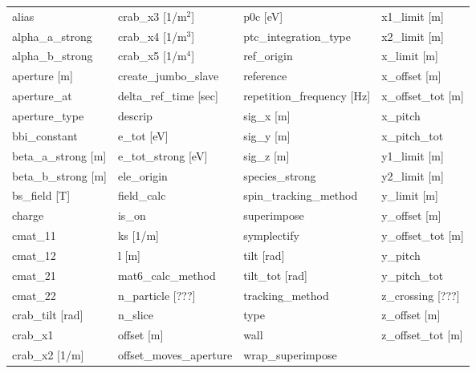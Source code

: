 \begin{tabular}{llll} \toprule
alias                            & crab_x3 [1/m$^2$]                & p0c [eV]                         & x1_limit [m]                     \\
alpha_a_strong                   & crab_x4 [1/m$^3$]                & ptc_integration_type             & x2_limit [m]                     \\
alpha_b_strong                   & crab_x5 [1/m$^4$]                & ref_origin                       & x_limit [m]                      \\
aperture [m]                     & create_jumbo_slave               & reference                        & x_offset [m]                     \\
aperture_at                      & delta_ref_time [sec]             & repetition_frequency [Hz]        & x_offset_tot [m]                 \\
aperture_type                    & descrip                          & sig_x [m]                        & x_pitch                          \\
bbi_constant                     & e_tot [eV]                       & sig_y [m]                        & x_pitch_tot                      \\
beta_a_strong [m]                & e_tot_strong [eV]                & sig_z [m]                        & y1_limit [m]                     \\
beta_b_strong [m]                & ele_origin                       & species_strong                   & y2_limit [m]                     \\
bs_field [T]                     & field_calc                       & spin_tracking_method             & y_limit [m]                      \\
charge                           & is_on                            & superimpose                      & y_offset [m]                     \\
cmat_11                          & ks [1/m]                         & symplectify                      & y_offset_tot [m]                 \\
cmat_12                          & l [m]                            & tilt [rad]                       & y_pitch                          \\
cmat_21                          & mat6_calc_method                 & tilt_tot [rad]                   & y_pitch_tot                      \\
cmat_22                          & n_particle [???]                 & tracking_method                  & z_crossing [???]                 \\
crab_tilt [rad]                  & n_slice                          & type                             & z_offset [m]                     \\
crab_x1                          & offset [m]                       & wall                             & z_offset_tot [m]                 \\
crab_x2 [1/m]                    & offset_moves_aperture            & wrap_superimpose                 &                                  \\
 \bottomrule
 \end{tabular}
